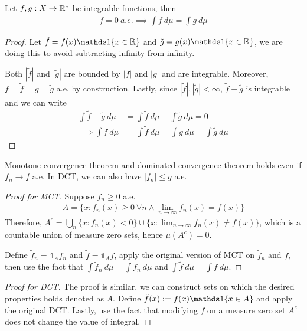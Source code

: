 \documentclass[11pt]{article}
\newcommand{\dmu}[0]{\ d\mu}
\begin{document}
	\begin{corollary}
		Let $f, g: X \to \mathbb{R}^*$ be integrable functions, then
		\begin{align}
			f = 0\ a.e. \implies \int f\ d\mu = \int g\ d\mu 
		\end{align}
		\begin{proof}
			Let $\tilde{f} = f(x) \id{x \in \R}$ and $\tilde{g} = g(x) \id{x \in \R}$, we are doing this to avoid subtracting infinity from infinity.
			
			Both $|\tilde{f}|$ and $|\tilde{g}|$ are bounded by $|f|$ and $|g|$ and are integrable. Moreover, $f = \tilde{f} = g = \tilde{g}$ a.e. by construction. Lastly, since $|\tilde{f}|, |\tilde{g}| < \infty$, $\tilde{f} - \tilde{g}$ is integrable and we can write
			\begin{align}
				\int \tilde{f} - \tilde{g}\ d\mu &= \int \tilde{f}\ d\mu - \int \tilde{g}\ d\mu = 0 \\
				\implies \int f\ d\mu &= \int \tilde{f}\ d\mu = \int g\dmu = \int \tilde{g}\dmu
			\end{align}
		\end{proof}
	\end{corollary}
	
	\begin{proposition}
		Monotone convergence theorem and dominated convergence theorem holds even if $f_n \to f$ a.e. In DCT, we can also have $|f_n| \leq g$ a.e.
		\begin{proof}[Proof for MCT]
			Suppose $f_n \geq 0$ a.e.
			\begin{align}
				A = \{x: f_n(x) \geq 0\ \forall n \land \lim_{n\to\infty} f_n(x) = f(x)\}
			\end{align}
			Therefore, $A^c = \bigcup_{n} \{x:f_n(x) < 0\} \cup \{x: \lim_{n\to\infty} f_n(x) \neq f(x)\}$, which is a countable union of measure zero sets, hence $\mu(A^c) = 0$.
			
			Define $\tilde{f}_n = \mathds{1}_A f_n$ and $\tilde{f} = \mathds{1}_A f$, apply the original version of MCT on $\tilde{f}_n$ and $f$, then use the fact that $\int \tilde{f}_n\dmu = \int f_n\dmu$ and $\int \tilde{f}\dmu = \int f\dmu$.
		\end{proof}
		\begin{proof}[Proof for DCT]
			The proof is similar, we can construct sets on which the desired properties holds denoted as $A$. Define $\tilde{f}(x) := f(x) \id{x \in A}$ and apply the original DCT. Lastly, use the fact that modifying $f$ on a measure zero set $A^c$ does not change the value of integral.
		\end{proof}
	\end{proposition}
\end{document}
